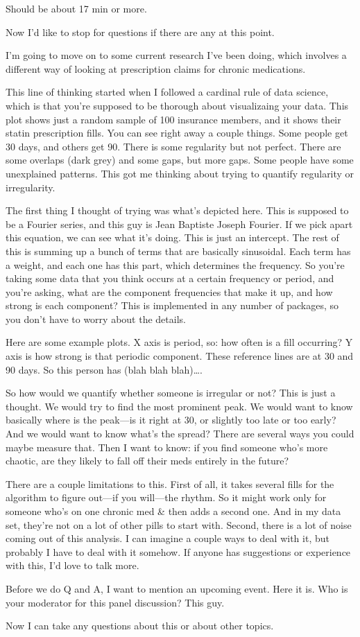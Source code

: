 \documentclass[12pt]{report}
\begin{document}
Should be about 17 min or more.

\begin{large}

Now I'd like to stop for questions if there are any at this point.

I'm going to move on to some current research I've been doing, which
involves a different way of looking at prescription claims for chronic
medications.

This line of thinking started when I followed a cardinal rule of data
science, which is that you're supposed to be thorough about
visualizaing your data. This plot shows just a random sample of 100
insurance members, and it shows their statin prescription fills. You
can see right away a couple things. Some people get 30 days, and
others get 90. There is some regularity but not perfect. There are
some overlaps (dark grey) and some gaps, but more gaps. Some people
have some unexplained patterns. This got me thinking about trying to
quantify regularity or irregularity.

The first thing I thought of trying was what's depicted here. This is
supposed to be a Fourier series, and this guy is Jean Baptiste Joseph
Fourier. If we pick apart this equation, we can see what it's doing.
This is just an intercept. The rest of this is summing up a bunch of
terms that are basically sinusoidal. Each term has a weight, and each
one has this part, which determines the frequency. So you're taking
some data that you think occurs at a certain frequency or period, and
you're asking, what are the component frequencies that make it up, and
how strong is each component? This is implemented in any number of
packages, so you don't have to worry about the details.

Here are some example plots. X axis is period, so: how often is a fill
occurring? Y axis is how strong is that periodic component. These
reference lines are at 30 and 90 days. So this person has (blah blah
blah)\ldots.

So how would we quantify whether someone is irregular or not? This is
just a thought. We would try to find the most prominent peak. We would
want to know basically where is the peak---is it right at 30, or
slightly too late or too early? And we would want to know what's the
spread? There are several ways you could maybe measure that. Then I
want to know: if you find someone who's more chaotic, are they likely
to fall off their meds entirely in the future?

There are a couple limitations to this. First of all, it takes several
fills for the algorithm to figure out---if you will---the rhythm. So
it might work only for someone who's on one chronic med & then adds a
second one. And in my data set, they're not on a lot of other pills to
start with. Second, there is a lot of noise coming out of this
analysis. I can imagine a couple ways to deal with it, but probably I
have to deal with it somehow. If anyone has suggestions or experience
with this, I'd love to talk more.

Before we do Q and A, I want to mention an upcoming event. Here it is.
Who is your moderator for this panel discussion? This guy.

Now I can take any questions about this or about other topics.

\end{large}
\end{document}
